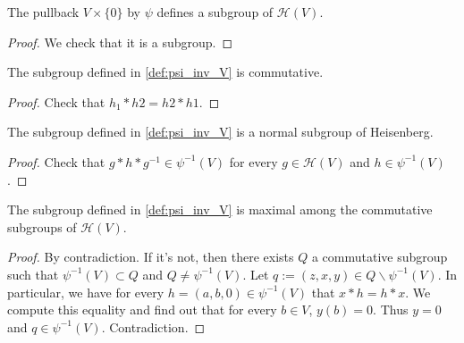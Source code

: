 \begin{definition}[$\psi^{-1}(V)$]
    \label{def:psi_inv_V}
    \leanok 

    The pullback $V\times\{0\}$ by $\psi$ defines a subgroup of $\mathcal{H}(V)$.
    \begin{proof}
        \leanok
        We check that it is a subgroup.
    \end{proof}
\end{definition}

\begin{proposition}
    \label{prop:psi_inv_V_comm}
    \leanok

    The subgroup defined in \ref{def:psi_inv_V} is commutative.
    \begin{proof}
        \leanok
        Check that $h_1*h2=h2*h1$.
    \end{proof}
\end{proposition}

\begin{proposition}
    \label{prop:psi_inv_V_normal}
    \leanok

    The subgroup defined in \ref{def:psi_inv_V} is a normal subgroup of Heisenberg.
    \begin{proof}
        \leanok 
        Check that $g*h*g^{-1}\in \psi^{-1}(V)$ for every $g\in \mathcal{H}(V)$ and $h\in \psi^{-1}(V)$.
    \end{proof}
\end{proposition}

\begin{proposition}
    \label{prop:psi_inv_V_max}
    \leanok

    The subgroup defined in \ref{def:psi_inv_V} is maximal among the
    commutative subgroups of $\mathcal{H}(V)$.
    \begin{proof}
        \leanok 
        By contradiction. If it's not, then there exists $Q$ a commutative subgroup
        such that $\psi^{-1}(V)\subset Q$ and $Q\ne \psi^{-1}(V)$. Let $q:=(z,x,y)\in Q\backslash \psi^{-1}(V)$.
        In particular, we have for every $h=(a,b,0)\in \psi^{-1}(V)$ that $x*h=h*x$.
        We compute this equality and find out that for every $b\in V$, $y(b)=0$. Thus $y=0$ and $q\in \psi^{-1}(V)$.
        Contradiction.
    \end{proof}
\end{proposition}

